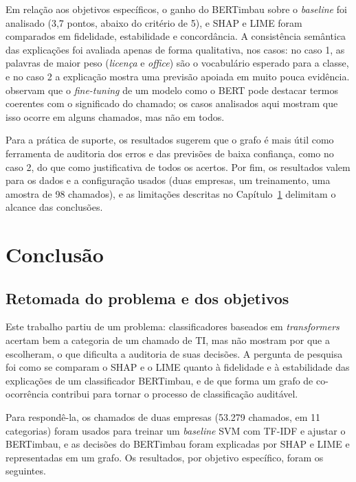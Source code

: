 \documentclass[
    12pt,                %
    openright,           %
    oneside,             %
    a4paper,             %
    english,             %
    brazil               %
]{abntex2}
\begin{document}
Em relação aos objetivos específicos, o ganho do BERTimbau sobre o \textit{baseline} foi analisado (3,7 pontos, abaixo do critério de 5), e SHAP e LIME foram comparados em fidelidade, estabilidade e concordância. A consistência semântica das explicações foi avaliada apenas de forma qualitativa, nos casos: no caso 1, as palavras de maior peso (\textit{licença} e \textit{office}) são o vocabulário esperado para a classe, e no caso 2 a explicação mostra uma previsão apoiada em muito pouca evidência.  observam que o \textit{fine-tuning} de um modelo como o BERT pode destacar termos coerentes com o significado do chamado; os casos analisados aqui mostram que isso ocorre em alguns chamados, mas não em todos.
 
Para a prática de suporte, os resultados sugerem que o grafo é mais útil como ferramenta de auditoria dos erros e das previsões de baixa confiança, como no caso 2, do que como justificativa de todos os acertos. Por fim, os resultados valem para os dados e a configuração usados (duas empresas, um treinamento, uma amostra de 98 chamados), e as limitações descritas no Capítulo~\ref{cap:conclusao} delimitam o alcance das conclusões.

\chapter{Conclusão}
\label{cap:conclusao}

\section{Retomada do problema e dos objetivos}
Este trabalho partiu de um problema: classificadores baseados em \textit{transformers} acertam bem a categoria de um chamado de TI, mas não mostram por que a escolheram, o que dificulta a auditoria de suas decisões. A pergunta de pesquisa foi como se comparam o SHAP e o LIME quanto à fidelidade e à estabilidade das explicações de um classificador BERTimbau, e de que forma um grafo de co-ocorrência contribui para tornar o processo de classificação auditável.

Para respondê-la, os chamados de duas empresas (53.279 chamados, em 11 categorias) foram usados para treinar um \textit{baseline} SVM com TF-IDF e ajustar o BERTimbau, e as decisões do BERTimbau foram explicadas por SHAP e LIME e representadas em um grafo. Os resultados, por objetivo específico, foram os seguintes.
\end{document}
